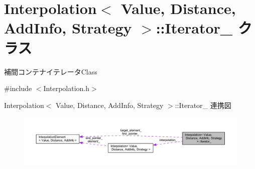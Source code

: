 \hypertarget{class_interpolation_1_1_iterator__}{}\section{Interpolation$<$ Value, Distance, Add\+Info, Strategy $>$\+:\+:Iterator\+\_\+ クラス}
\label{class_interpolation_1_1_iterator__}


補間コンテナイテレータ\+Class  




{\ttfamily \#include $<$Interpolation.\+h$>$}



Interpolation$<$ Value, Distance, Add\+Info, Strategy $>$\+:\+:Iterator\+\_\+ 連携図\nopagebreak
\begin{figure}[H]
\begin{center}
\leavevmode
\includegraphics[width=350pt]{class_interpolation_1_1_iterator____coll__graph}
\end{center}
\end{figure}
